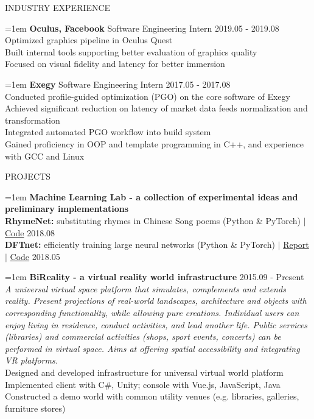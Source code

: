 \documentclass[10pt]{article}
\begin{document}
\vspace{1em}
{\LARGE INDUSTRY EXPERIENCE}

\hangindent=1em
\textbf{Oculus, Facebook} \hfill Software Engineering Intern \hfill 2019.05 - 2019.08 \\
Optimized graphics pipeline in Oculus Quest \\
Built internal tools supporting better evaluation of graphics quality \\
Focused on visual fidelity and latency for better immersion

\hangindent=1em
\textbf{Exegy} \hfill Software Engineering Intern \hfill 2017.05 - 2017.08 \\
Conducted profile-guided optimization (PGO) on the core software of Exegy \\
Achieved significant reduction on latency of market data feeds normalization and transformation \\
Integrated automated PGO workflow into build system \\
Gained proficiency in OOP and template programming in C++, and experience with GCC and Linux

\vspace{1em}
{\LARGE PROJECTS}

\hangindent=1em
\textbf{Machine Learning Lab - a collection of experimental ideas and preliminary implementations} \\
\textbf{RhymeNet:} substituting rhymes in Chinese Song poems (Python \& PyTorch) $|$ \href{https://github.com/liujch1998/Lab/tree/master/ml-songci}{Code} \hfill 2018.08 \\
\textbf{DFTnet:} efficiently training large neural networks (Python \& PyTorch) $|$ \href{https://github.com/liujch1998/Lab/blob/master/ml-dft-nn/report/report.pdf}{Report} $|$ \href{https://github.com/liujch1998/Lab/tree/master/ml-dft-nn}{Code} \hfill 2018.05

\hangindent=1em
\textbf{BiReality - a virtual reality world infrastructure} \hfill 2015.09 - Present \\
\textit{A universal virtual space platform that simulates, complements and extends reality. Present projections of real-world landscapes, architecture and objects with corresponding functionality, while allowing pure creations. Individual users can enjoy living in residence, conduct activities, and lead another life. Public services (libraries) and commercial activities (shops, sport events, concerts) can be performed in virtual space. Aims at offering spatial accessibility and integrating VR platforms.} \\
Designed and developed infrastructure for universal virtual world platform \\
Implemented client with C\#, Unity; console with Vue.js, JavaScript, Java \\
Constructed a demo world with common utility venues (e.g. libraries, galleries, furniture stores)
\end{document}
